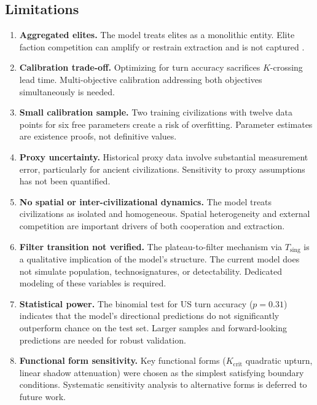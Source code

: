 \subsection{Limitations}
\label{sec:limitations}

\begin{enumerate}[label=(\roman*)]
    \item \textbf{Aggregated elites.} The model treats elites as a monolithic entity. Elite faction competition can amplify or restrain extraction and is not captured \cite{acemoglu2012,turchin2016}.
    \item \textbf{Calibration trade-off.} Optimizing for turn accuracy sacrifices $K$-crossing lead time. Multi-objective calibration addressing both objectives simultaneously is needed.
    \item \textbf{Small calibration sample.} Two training civilizations with twelve data points for six free parameters create a risk of overfitting. Parameter estimates are existence proofs, not definitive values.
    \item \textbf{Proxy uncertainty.} Historical proxy data involve substantial measurement error, particularly for ancient civilizations. Sensitivity to proxy assumptions has not been quantified.
    \item \textbf{No spatial or inter-civilizational dynamics.} The model treats civilizations as isolated and homogeneous. Spatial heterogeneity and external competition are important drivers of both cooperation and extraction.
    \item \textbf{Filter transition not verified.} The plateau-to-filter mechanism via $T_{\text{sing}}$ is a qualitative implication of the model's structure. The current model does not simulate population, technosignatures, or detectability. Dedicated modeling of these variables is required.
    \item \textbf{Statistical power.} The binomial test for US turn accuracy ($p = 0.31$) indicates that the model's directional predictions do not significantly outperform chance on the test set. Larger samples and forward-looking predictions are needed for robust validation.
    \item \textbf{Functional form sensitivity.} Key functional forms ($K_{\text{crit}}$ quadratic upturn, linear shadow attenuation) were chosen as the simplest satisfying boundary conditions. Systematic sensitivity analysis to alternative forms is deferred to future work.
\end{enumerate}
